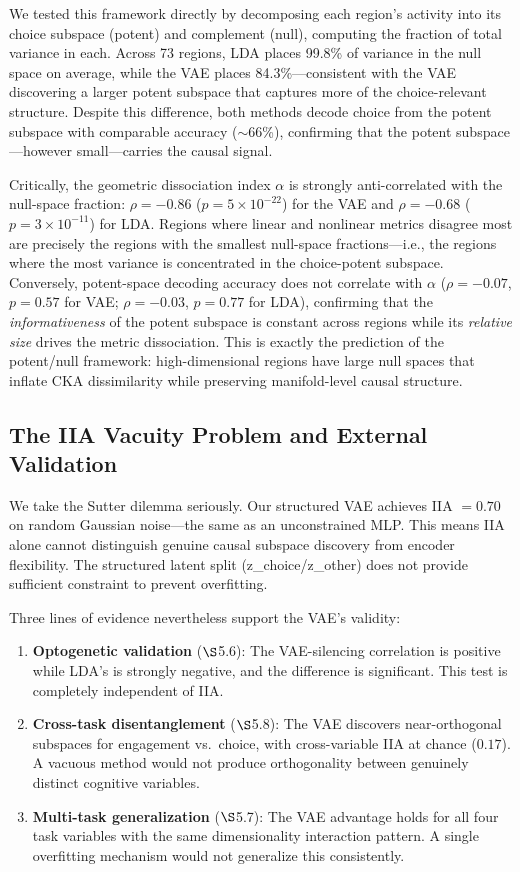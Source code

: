 \documentclass{article}
\begin{document}
We tested this framework directly by decomposing each region's activity into its choice subspace (potent) and complement (null), computing the fraction of total variance in each. Across 73 regions, LDA places 99.8\% of variance in the null space on average, while the VAE places 84.3\%---consistent with the VAE discovering a larger potent subspace that captures more of the choice-relevant structure. Despite this difference, both methods decode choice from the potent subspace with comparable accuracy ($\sim$66\%), confirming that the potent subspace---however small---carries the causal signal.

Critically, the geometric dissociation index $\alpha$ is strongly anti-correlated with the null-space fraction: $\rho = -0.86$ ($p = 5 \times 10^{-22}$) for the VAE and $\rho = -0.68$ ($p = 3 \times 10^{-11}$) for LDA. Regions where linear and nonlinear metrics disagree most are precisely the regions with the smallest null-space fractions---i.e., the regions where the most variance is concentrated in the choice-potent subspace. Conversely, potent-space decoding accuracy does not correlate with $\alpha$ ($\rho = -0.07$, $p = 0.57$ for VAE; $\rho = -0.03$, $p = 0.77$ for LDA), confirming that the \emph{informativeness} of the potent subspace is constant across regions while its \emph{relative size} drives the metric dissociation. This is exactly the prediction of the potent/null framework: high-dimensional regions have large null spaces that inflate CKA dissimilarity while preserving manifold-level causal structure.

\subsection{The IIA Vacuity Problem and External Validation}

We take the Sutter dilemma seriously. Our structured VAE achieves IIA $= 0.70$ on random Gaussian noise---the same as an unconstrained MLP. This means IIA alone cannot distinguish genuine causal subspace discovery from encoder flexibility. The structured latent split (z\_choice/z\_other) does not provide sufficient constraint to prevent overfitting.

Three lines of evidence nevertheless support the VAE's validity:

\begin{enumerate}
\item \textbf{Optogenetic validation} ($\S$5.6): The VAE-silencing correlation is positive while LDA's is strongly negative, and the difference is significant. This test is completely independent of IIA.
\item \textbf{Cross-task disentanglement} ($\S$5.8): The VAE discovers near-orthogonal subspaces for engagement vs.\ choice, with cross-variable IIA at chance ($0.17$). A vacuous method would not produce orthogonality between genuinely distinct cognitive variables.
\item \textbf{Multi-task generalization} ($\S$5.7): The VAE advantage holds for all four task variables with the same dimensionality interaction pattern. A single overfitting mechanism would not generalize this consistently.
\end{enumerate}
\end{document}
